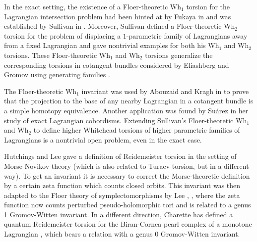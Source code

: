 \documentclass[JEP,XML,SOM,Unicode,NoFloatCountersInSection]{cedram}
\newcommand{\Wh}{\mathrm{Wh}}
\theoremstyle{plain}
\theoremstyle{definition}
\begin{document}
In the exact setting, the existence of a Floer-theoretic $\Wh_1$ torsion for the Lagran\-gian intersection problem had been hinted at by Fukaya in \cite{F95} and was established by Sullivan in \cite{S02}. Moreover, Sullivan defined a Floer-theoretic $\Wh_2$ torsion for the problem of displacing a $1$-parametric family of Lagrangians away from a fixed Lagrangian and gave nontrivial examples for both his $\Wh_1$ and $\Wh_2$ torsions. These Floer-theoretic $\Wh_1$ and $\Wh_2$ torsions generalize the corresponding torsions in cotangent bundles considered by Eliashberg and Gromov using generating families \cite{EG98}.

The Floer-theoretic $\Wh_1$ invariant was used by Abouzaid and Kragh in \cite{AK18} to prove that the projection to the base of any nearby Lagrangian in a cotangent bundle is a simple homotopy equivalence. Another application was found by Suárez \cite{S17} in her study of exact Lagrangian cobordisms. Extending Sullivan's Floer-theoretic $\Wh_1$ and $\Wh_2$ to define higher Whitehead torsions of higher parametric families of Lagrangians is a nontrivial open problem, even in the exact case.

Hutchings and Lee gave a definition of Reidemeister torsion in the setting of Morse-Novikov theory \cite{HL99} (which is also related to Turaev torsion, but in a different way). To get an invariant it is necessary to correct the Morse-theoretic definition by a certain zeta function which counts closed orbits. This invariant was then adapted to the Floer theory of symplectomorphisms by Lee \cite{L05a}, \cite{L05b}, where the zeta function now counts perturbed pseudo-holomorphic tori and is related to a genus 1 Gromov-Witten invariant. In a different direction, Charette has defined a quantum Reidemeister torsion for the Biran-Cornea pearl complex of a monotone Lagrangian \cite{C17}, which bears a relation with a genus 0 Gromov-Witten invariant.

\backmatter


\end{document}
